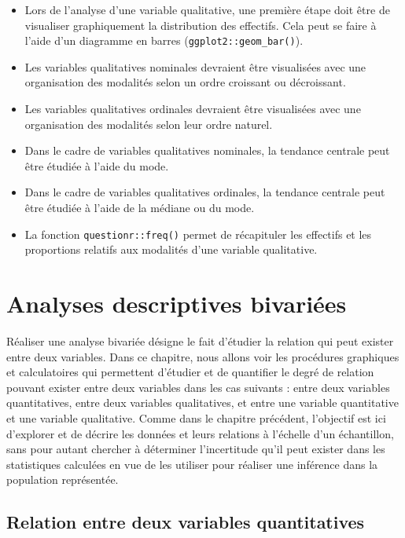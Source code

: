 \documentclass[
  french,
]{book}
\begin{document}
\begin{itemize}
\item
  Lors de l'analyse d'une variable qualitative, une première étape doit être de visualiser graphiquement la distribution des effectifs. Cela peut se faire à l'aide d'un diagramme en barres (\texttt{ggplot2::geom\_bar()}).
\item
  Les variables qualitatives nominales devraient être visualisées avec une organisation des modalités selon un ordre croissant ou décroissant.
\item
  Les variables qualitatives ordinales devraient être visualisées avec une organisation des modalités selon leur ordre naturel.
\item
  Dans le cadre de variables qualitatives nominales, la tendance centrale peut être étudiée à l'aide du mode.
\item
  Dans le cadre de variables qualitatives ordinales, la tendance centrale peut être étudiée à l'aide de la médiane ou du mode.
\item
  La fonction \texttt{questionr::freq()} permet de récapituler les effectifs et les proportions relatifs aux modalités d'une variable qualitative.
\end{itemize}

\hypertarget{analyses-descriptives-bivariuxe9es}{%
\chapter{Analyses descriptives bivariées}\label{analyses-descriptives-bivariuxe9es}}

Réaliser une analyse bivariée désigne le fait d'étudier la relation qui peut exister entre deux variables. Dans ce chapitre, nous allons voir les procédures graphiques et calculatoires qui permettent d'étudier et de quantifier le degré de relation pouvant exister entre deux variables dans les cas suivants : entre deux variables quantitatives, entre deux variables qualitatives, et entre une variable quantitative et une variable qualitative. Comme dans le chapitre précédent, l'objectif est ici d'explorer et de décrire les données et leurs relations à l'échelle d'un échantillon, sans pour autant chercher à déterminer l'incertitude qu'il peut exister dans les statistiques calculées en vue de les utiliser pour réaliser une inférence dans la population représentée.

\hypertarget{relation-entre-deux-variables-quantitatives}{%
\section{Relation entre deux variables quantitatives}\label{relation-entre-deux-variables-quantitatives}}
\end{document}
